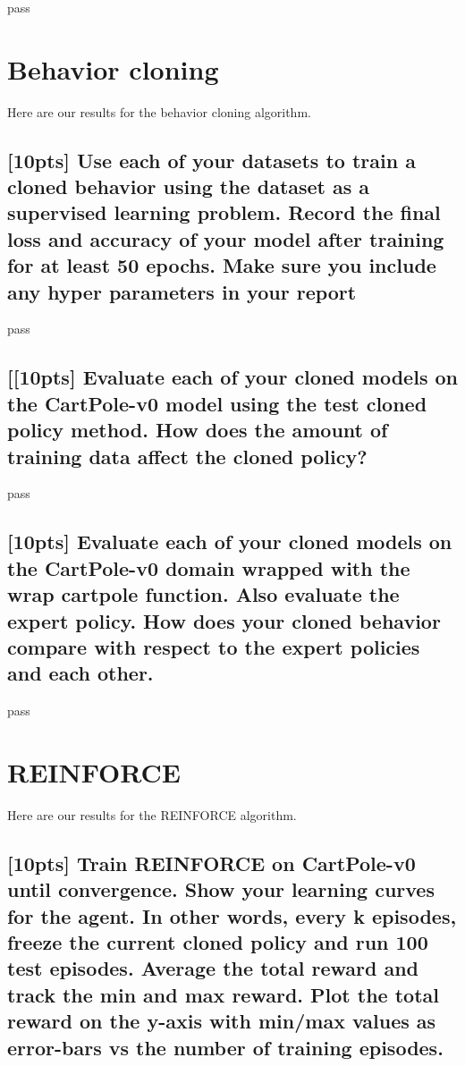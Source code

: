 \documentclass{article}
\begin{document}
pass




\section{Behavior cloning}
Here are our results for the behavior cloning algorithm. 

\subsection{[10pts] Use each of your datasets to train a cloned behavior using the dataset as a supervised learning problem. Record the final loss and accuracy of your model after training for at least 50 epochs. Make sure you include any hyper parameters in your report}

pass

\subsection{[[10pts] Evaluate each of your cloned models on the CartPole-v0 model using the test cloned policy method. How does the amount of training data affect the cloned policy?}

pass

\subsection{[10pts] Evaluate each of your cloned models on the CartPole-v0 domain wrapped with the wrap cartpole function. Also evaluate the expert policy. How does your cloned behavior compare with respect to the expert policies and each other.}

pass



\section{REINFORCE}
Here are our results for the REINFORCE algorithm. 

\subsection{[10pts] Train REINFORCE on CartPole-v0 until convergence. Show your learning curves for the agent. In other words, every k episodes, freeze the current cloned policy and run 100 test episodes. Average the total reward and track the min and max reward. Plot the total reward on the y-axis with min/max values as error-bars vs the number of training episodes.}
\end{document}

